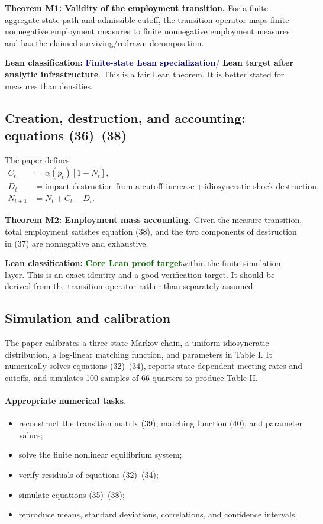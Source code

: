 \documentclass[11pt]{article}
\newcommand{\leanclass}[1]{\textbf{Lean classification:} #1}
\newcommand{\core}{\textcolor{darkGreen}{\textbf{Core Lean proof target}}}
\newcommand{\infra}{\textcolor{darkAmber}{\textbf{Lean target after analytic infrastructure}}}
\newcommand{\finite}{\textcolor{navy}{\textbf{Finite-state Lean specialization}}}
\newcommand{\resultname}[1]{\medskip\noindent\textbf{#1.}}
\begin{document}
\resultname{Theorem M1: Validity of the employment transition}
For a finite aggregate-state path and admissible cutoff, the transition operator maps finite nonnegative employment measures to finite nonnegative employment measures and has the claimed surviving/redrawn decomposition.

\leanclass{\finite / \infra.}
This is a fair Lean theorem. It is better stated for measures than densities.

\subsection{Creation, destruction, and accounting: equations (36)--(38)}

The paper defines
\begin{align}
 C_t&=\alpha(p_t)[1-N_t], \tag{36}\\
 D_t&=\text{impact destruction from a cutoff increase}
 +\text{idiosyncratic-shock destruction}, \tag{37}\\
 N_{t+1}&=N_t+C_t-D_t. \tag{38}
\end{align}

\resultname{Theorem M2: Employment mass accounting}
Given the measure transition, total employment satisfies equation (38), and the two components of destruction in (37) are nonnegative and exhaustive.

\leanclass{\core within the finite simulation layer.}
This is an exact identity and a good verification target. It should be derived from the transition operator rather than separately assumed.

\subsection{Simulation and calibration}

The paper calibrates a three-state Markov chain, a uniform idiosyncratic distribution, a log-linear matching function, and parameters in Table I. It numerically solves equations (32)--(34), reports state-dependent meeting rates and cutoffs, and simulates 100 samples of 66 quarters to produce Table II.

\paragraph{Appropriate numerical tasks.}
\begin{itemize}
\item reconstruct the transition matrix (39), matching function (40), and parameter values;
\item solve the finite nonlinear equilibrium system;
\item verify residuals of equations (32)--(34);
\item simulate equations (35)--(38);
\item reproduce means, standard deviations, correlations, and confidence intervals.
\end{itemize}
\end{document}
